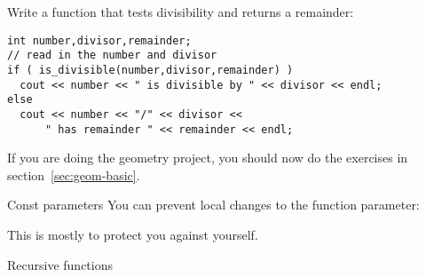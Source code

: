 \begin{exercise}
  \label{ex:div-remain}
  Write a function that tests divisibility and returns a remainder:

{\small
\begin{verbatim}
int number,divisor,remainder;
// read in the number and divisor
if ( is_divisible(number,divisor,remainder) )
  cout << number << " is divisible by " << divisor << endl;
else
  cout << number << "/" << divisor <<
      " has remainder " << remainder << endl;
\end{verbatim}
}
\end{exercise}

\begin{exercise}
  If you are doing the geometry project, you should now do the exercises
  in section~\ref{sec:geom-basic}.
\end{exercise}

\begin{block}{Const parameters}
  \label{sl:pass-constref}
  You can prevent local changes to the function parameter:


  This is mostly to protect you against yourself.
\end{block}

 {Recursive functions}
\label{sec:recursion}

